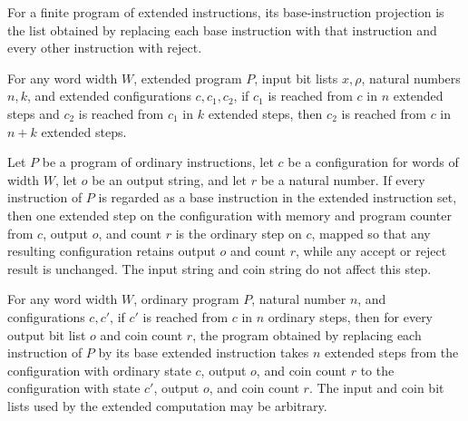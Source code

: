\begin{definition}
\label{WordRAM.XProgram.proj}
\leanok
{}
For a finite program of extended instructions, its base-instruction projection is the
list obtained by replacing each base instruction with that instruction and every other
instruction with reject.
\end{definition}

\begin{theorem}
\label{WordRAM.XSteps.trans}
\leanok
{}
For any word width $W$, extended program $P$, input bit lists $x,\rho$, natural numbers
$n,k$, and extended configurations $c,c_1,c_2$, if $c_1$ is reached from $c$ in $n$
extended steps and $c_2$ is reached from $c_1$ in $k$ extended steps, then $c_2$ is
reached from $c$ in $n+k$ extended steps.
\end{theorem}

\begin{theorem}
\label{WordRAM.xstep_map_base}
\leanok
{}
Let $P$ be a program of ordinary instructions, let $c$ be a configuration for words of
width $W$, let $o$ be an output string, and let $r$ be a natural number. If every
instruction of $P$ is regarded as a base instruction in the extended instruction set,
then one extended step on the configuration with memory and program counter from $c$,
output $o$, and count $r$ is the ordinary step on $c$, mapped so that any resulting
configuration retains output $o$ and count $r$, while any accept or reject result is
unchanged. The input string and coin string do not affect this step.
\end{theorem}

\begin{theorem}
\label{WordRAM.XSteps.of_steps}
\leanok
{}
For any word width $W$, ordinary program $P$, natural number $n$, and configurations
$c,c'$, if $c'$ is reached from $c$ in $n$ ordinary steps, then for every output bit
list $o$ and coin count $r$, the program obtained by replacing each instruction of $P$
by its base extended instruction takes $n$ extended steps from the configuration with
ordinary state $c$, output $o$, and coin count $r$ to the configuration with state $c'$,
output $o$, and coin count $r$. The input and coin bit lists used by the extended
computation may be arbitrary.
\end{theorem}

